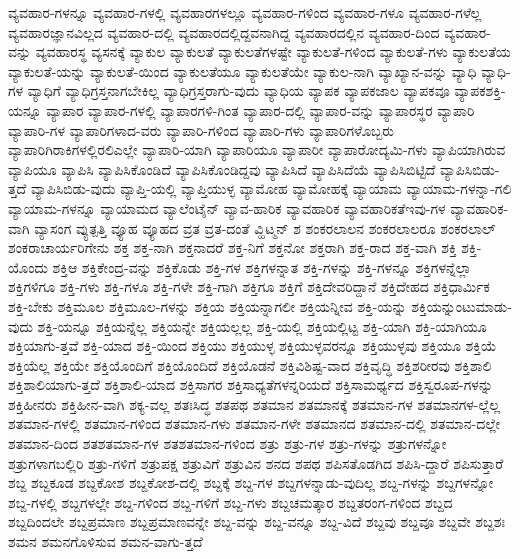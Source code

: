 {ವ್ಯವಹಾರ-ಗಳನ್ನೂ
ವ್ಯವಹಾರ-ಗಳಲ್ಲಿ
ವ್ಯವಹಾರಗಳಲ್ಲೂ
ವ್ಯವಹಾರ-ಗಳಿಂದ
ವ್ಯವಹಾರ-ಗಳೂ
ವ್ಯವಹಾರ-ಗಳೆಲ್ಲ
ವ್ಯವಹಾರಜ್ಞಾನವಿಲ್ಲದ
ವ್ಯವಹಾರ-ದಲ್ಲಿ
ವ್ಯವಹಾರದಲ್ಲಿದ್ದವನಾಗಿದ್ದ
ವ್ಯವಹಾರದಲ್ಲಿನ
ವ್ಯವಹಾರ-ದಿಂದ
ವ್ಯವಹಾರ-ವನ್ನು
ವ್ಯವಹಾರಸ್ಥ
ವ್ಯಸನಕ್ಕೆ
ವ್ಯಾಕುಲ
ವ್ಯಾಕುಲತೆ
ವ್ಯಾಕುಲತೆಗಳಷ್ಟೇ
ವ್ಯಾಕುಲತೆ-ಗಳಿಂದ
ವ್ಯಾಕುಲತೆ-ಗಳು
ವ್ಯಾಕುಲತೆಯ
ವ್ಯಾಕುಲತೆ-ಯನ್ನು
ವ್ಯಾಕುಲತೆ-ಯಿಂದ
ವ್ಯಾಕುಲತೆಯೂ
ವ್ಯಾಕುಲತೆಯೇ
ವ್ಯಾಕುಲ-ನಾಗಿ
ವ್ಯಾಖ್ಯಾನ-ವನ್ನು
ವ್ಯಾಧಿ
ವ್ಯಾಧಿ-ಗಳ
ವ್ಯಾಧಿಗೆ
ವ್ಯಾಧಿಗ್ರಸ್ತನಾಗಬೇಕಿಲ್ಲ
ವ್ಯಾಧಿಗ್ರಸ್ತರಾಗು-ವುದು
ವ್ಯಾಧಿಯ
ವ್ಯಾಪಕ
ವ್ಯಾಪಕಜಾಲ
ವ್ಯಾಪಕವೂ
ವ್ಯಾಪಕಶಕ್ತಿ-ಯನ್ನೂ
ವ್ಯಾಪಾರ
ವ್ಯಾಪಾರ-ಗಳಲ್ಲಿ
ವ್ಯಾಪಾರಗಳಿ-ಗಿಂತ
ವ್ಯಾಪಾರ-ದಲ್ಲಿ
ವ್ಯಾಪಾರ-ವನ್ನು
ವ್ಯಾಪಾರಸ್ಥರ
ವ್ಯಾಪಾರಿ
ವ್ಯಾಪಾರಿ-ಗಳ
ವ್ಯಾಪಾರಿಗಳಾದ-ವರು
ವ್ಯಾಪಾರಿ-ಗಳಿಂದ
ವ್ಯಾಪಾರಿ-ಗಳು
ವ್ಯಾಪಾರಿಗಳೊಬ್ಬರು
ವ್ಯಾಪಾರಿಗಿರಾಕಿಗಳಲ್ಲಿರಲಿಎಲ್ಲೇ
ವ್ಯಾಪಾರಿ-ಯಾಗಿ
ವ್ಯಾಪಾರಿಯೂ
ವ್ಯಾಪಾರೀ
ವ್ಯಾಪಾರೋದ್ಯಮಿ-ಗಳು
ವ್ಯಾಪಿಯಾಗಿರುವ
ವ್ಯಾಪಿಯೂ
ವ್ಯಾಪಿಸಿ
ವ್ಯಾಪಿಸಿಕೊಂಡಿದೆ
ವ್ಯಾಪಿಸಿಕೊಂಡಿದ್ದವು
ವ್ಯಾಪಿಸಿದೆ
ವ್ಯಾಪಿಸಿದೆಯೆ
ವ್ಯಾಪಿಸಿಬಿಟ್ಟಿದೆ
ವ್ಯಾಪಿಸಿಬಿಡು-ತ್ತದೆ
ವ್ಯಾಪಿಸಿಬಿಡು-ವುದು
ವ್ಯಾಪ್ತಿ-ಯಲ್ಲಿ
ವ್ಯಾಪ್ತಿಯುಳ್ಳ
ವ್ಯಾಮೋಹ
ವ್ಯಾಮೋಹಕ್ಕೆ
ವ್ಯಾಯಾಮ
ವ್ಯಾಯಾಮ-ಗಳನ್ನಾ-ಗಲಿ
ವ್ಯಾಯಾಮ-ಗಳನ್ನೂ
ವ್ಯಾಯಾಮದ
ವ್ಯಾಲೆಂಟೈನ್
ವ್ಯಾವ-ಹಾರಿಕ
ವ್ಯಾವಹಾರಿಕ
ವ್ಯಾವಹಾರಿಕತೆಇವು-ಗಳ
ವ್ಯಾವಹಾರಿಕ-ವಾಗಿ
ವ್ಯಾಸಂಗ
ವ್ಯುತ್ಪತ್ತಿ
ವ್ಯೂಹ
ವ್ಯೂಹದ
ವ್ರತ
ವ್ರತ-ದಂತೆ
ವ್ಹಿಟ್ಮನ್
ಶ
ಶಂಕರಲಾಲನ
ಶಂಕರಲಾಲರೂ
ಶಂಕರಲಾಲ್
ಶಂಕರಾಚಾರ್ಯರಿಗೇನು
ಶಕ್ತ
ಶಕ್ತ-ನಾಗಿ
ಶಕ್ತನಾದರೆ
ಶಕ್ತ-ನಿಗೆ
ಶಕ್ತನೋ
ಶಕ್ತರಾಗಿ
ಶಕ್ತ-ರಾದ
ಶಕ್ತ-ವಾಗಿ
ಶಕ್ತಿ
ಶಕ್ತಿ-ಯೊಂದು
ಶಕ್ತಿಆ
ಶಕ್ತಿಕೇಂದ್ರ-ವನ್ನು
ಶಕ್ತಿಕೊಡು
ಶಕ್ತಿ-ಗಳ
ಶಕ್ತಿಗಳನ್ನಾತ
ಶಕ್ತಿ-ಗಳನ್ನು
ಶಕ್ತಿ-ಗಳನ್ನೂ
ಶಕ್ತಿಗಳನ್ನೆಲ್ಲಾ
ಶಕ್ತಿಗಳಿಗೂ
ಶಕ್ತಿ-ಗಳು
ಶಕ್ತಿ-ಗಳೂ
ಶಕ್ತಿ-ಗಳೇ
ಶಕ್ತಿ-ಗಾಗಿ
ಶಕ್ತಿಗೂ
ಶಕ್ತಿಗೆ
ಶಕ್ತಿದೇವರಿದ್ದಾನೆ
ಶಕ್ತಿದೇಹದ
ಶಕ್ತಿಧಾರ್ಮಿಕ
ಶಕ್ತಿ-ಬೇಕು
ಶಕ್ತಿಮೂಲ
ಶಕ್ತಿಮೂಲ-ಗಳನ್ನು
ಶಕ್ತಿಯ
ಶಕ್ತಿಯನ್ನಾಗಲೀ
ಶಕ್ತಿಯನ್ನೀವ
ಶಕ್ತಿ-ಯನ್ನು
ಶಕ್ತಿಯನ್ನುಂಟುಮಾಡು-ವುದು
ಶಕ್ತಿ-ಯನ್ನೂ
ಶಕ್ತಿಯನ್ನೆಲ್ಲ
ಶಕ್ತಿಯನ್ನೇ
ಶಕ್ತಿಯಲ್ಲಲ್ಲ
ಶಕ್ತಿ-ಯಲ್ಲಿ
ಶಕ್ತಿಯಲ್ಲಿಟ್ಟ
ಶಕ್ತಿ-ಯಾಗಿ
ಶಕ್ತಿ-ಯಾಗಿಯೂ
ಶಕ್ತಿಯಾಗು-ತ್ತವೆ
ಶಕ್ತಿ-ಯಾದ
ಶಕ್ತಿ-ಯಿಂದ
ಶಕ್ತಿಯು
ಶಕ್ತಿಯುಳ್ಳ
ಶಕ್ತಿಯುಳ್ಳವರನ್ನೂ
ಶಕ್ತಿಯುಳ್ಳವು
ಶಕ್ತಿಯೂ
ಶಕ್ತಿಯೆ
ಶಕ್ತಿಯೆಲ್ಲ
ಶಕ್ತಿಯೇ
ಶಕ್ತಿಯೊಂದಿಗೆ
ಶಕ್ತಿಯೊಂದಿದೆ
ಶಕ್ತಿಯೊಡನೆ
ಶಕ್ತಿವಿಶಿಷ್ಟ-ವಾದ
ಶಕ್ತಿವೃದ್ಧಿ
ಶಕ್ತಿಶರೀರವು
ಶಕ್ತಿಶಾಲಿ
ಶಕ್ತಿಶಾಲಿಯಾಗು-ತ್ತದೆ
ಶಕ್ತಿಶಾಲಿ-ಯಾದ
ಶಕ್ತಿಸಾಗರ
ಶಕ್ತಿಸಾಧ್ಯತೆಗಳನ್ನರಿಯದೆ
ಶಕ್ತಿಸಾಮರ್ಥ್ಯದ
ಶಕ್ತಿಸ್ವರೂಪ-ಗಳನ್ನು
ಶಕ್ತಿಹೀನರು
ಶಕ್ತಿಹೀನ-ವಾಗಿ
ಶಕ್ಯ-ವಲ್ಲ
ಶತಃಸಿದ್ಧ
ಶತಪಥ
ಶತಮಾನ
ಶತಮಾನಕ್ಕೆ
ಶತಮಾನ-ಗಳ
ಶತಮಾನಗಳ-ಲ್ಲೆಲ್ಲ
ಶತಮಾನ-ಗಳಲ್ಲಿ
ಶತಮಾನ-ಗಳಿಂದ
ಶತಮಾನ-ಗಳು
ಶತಮಾನ-ಗಳೇ
ಶತಮಾನದ
ಶತಮಾನ-ದಲ್ಲಿ
ಶತಮಾನ-ದಲ್ಲೇ
ಶತಮಾನ-ದಿಂದ
ಶತಶತಮಾನ-ಗಳ
ಶತಶತಮಾನ-ಗಳಿಂದ
ಶತ್ರು
ಶತ್ರು-ಗಳ
ಶತ್ರು-ಗಳನ್ನು
ಶತ್ರುಗಳನ್ನೋ
ಶತ್ರುಗಳಾಗಬಲ್ಲಿರಿ
ಶತ್ರು-ಗಳಿಗೆ
ಶತ್ರುಪಕ್ಷ
ಶತ್ರುವಿಗೆ
ಶತ್ರುವಿನ
ಶನದ
ಶಪಥ
ಶಪಿಸತೊಡಗಿದ
ಶಪಿಸಿ-ದ್ದಾರೆ
ಶಪಿಸುತ್ತಾರೆ
ಶಬ್ದ
ಶಬ್ದಕೂಡ
ಶಬ್ದಕೋಶ
ಶಬ್ದಕೋಶ-ದಲ್ಲಿ
ಶಬ್ದಕ್ಕೆ
ಶಬ್ದ-ಗಳ
ಶಬ್ದಗಳನ್ನಾಡು-ವುದಿಲ್ಲ
ಶಬ್ದ-ಗಳನ್ನು
ಶಬ್ದಗಳನ್ನೋ
ಶಬ್ದ-ಗಳಲ್ಲಿ
ಶಬ್ದಗಳಲ್ಲೇ
ಶಬ್ದ-ಗಳಿಂದ
ಶಬ್ದ-ಗಳಿಗೆ
ಶಬ್ದ-ಗಳು
ಶಬ್ದಚಮತ್ಕಾರ
ಶಬ್ದತರಂಗ-ಗಳಿಂದ
ಶಬ್ದದ
ಶಬ್ದದಿಂದಲೇ
ಶಬ್ದಪ್ರಮಾಣ
ಶಬ್ದಪ್ರಮಾಣವನ್ನೇ
ಶಬ್ದ-ವನ್ನು
ಶಬ್ದ-ವನ್ನೂ
ಶಬ್ದ-ವಿದೆ
ಶಬ್ದವು
ಶಬ್ದವೂ
ಶಬ್ದವೇ
ಶಬ್ದಶಃ
ಶಮನ
ಶಮನಗೊಳಿಸುವ
ಶಮನ-ವಾಗು-ತ್ತದೆ
}
